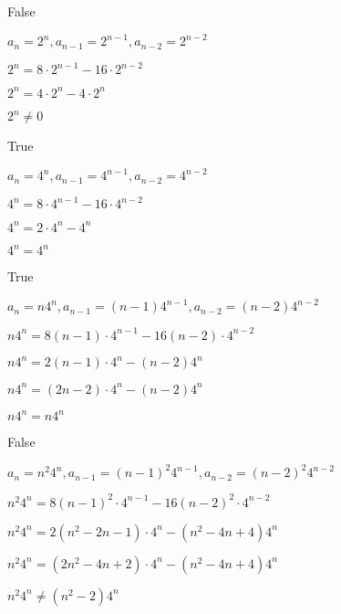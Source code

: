 \documentclass{exam}
\begin{document}
\begin{questions}
\begin{subparts}

\begin{center}
False

\( a_n = 2^n, a_{n-1} = 2^{n-1}, a_{n-2} = 2^{n-2} \)

\( 2^n = 8 \cdot 2^{n-1} - 16 \cdot 2^{n-2} \)

\( 2^n = 4 \cdot 2^{n} - 4 \cdot 2^{n} \)

\( 2^n \neq 0 \)

\end{center}


\begin{center}
True

\( a_n = 4^n, a_{n-1} = 4^{n-1}, a_{n-2} = 4^{n-2} \)

\( 4^n = 8 \cdot 4^{n-1} - 16 \cdot 4^{n-2} \)

\( 4^n = 2 \cdot 4^{n} -  4^{n} \)

\( 4^n = 4^n \)

\end{center}


\begin{center}
True

\( a_n = n4^n, a_{n-1} = (n-1)4^{n-1}, a_{n-2} = (n-2)4^{n-2} \)

\( n4^n = 8(n-1) \cdot 4^{n-1} - 16(n-2) \cdot 4^{n-2} \)

\( n4^n = 2(n-1) \cdot 4^{n} - (n-2)4^{n} \)

\( n4^n = (2n-2) \cdot 4^{n} - (n-2)4^n \)

\( n4^n = n4^{n} \)

\end{center}


\begin{center}
False

\( a_n = n^2 4^n, a_{n-1} = (n-1)^2 4^{n-1}, a_{n-2} = (n-2)^2 4^{n-2} \)

\( n^2 4^n = 8(n-1)^2 \cdot 4^{n-1} - 16(n-2)^2 \cdot 4^{n-2} \)

\( n^2 4^n = 2(n^2-2n-1) \cdot 4^{n} - (n^2-4n+4)4^{n} \)

\( n^2 4^n = (2n^2-4n+2) \cdot 4^{n} - (n^2-4n+4)4^n \)

\( n^2 4^n \neq (n^2-2)4^{n} \)

\end{center}


\end{subparts}
\end{questions}
\end{document}
